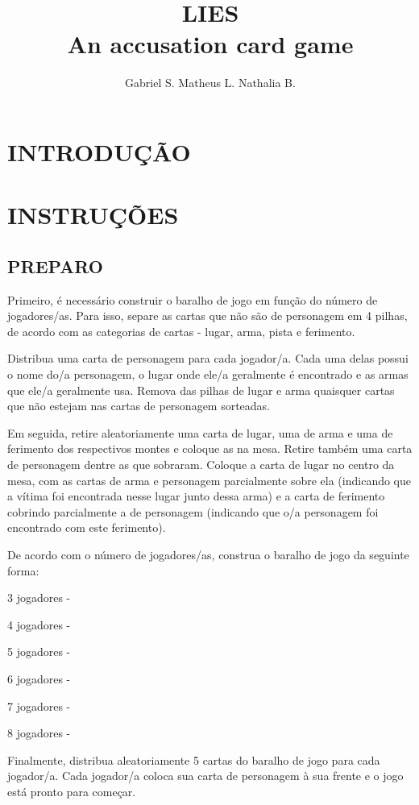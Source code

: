 \documentclass[a4paper, 11pt]{article}
\title{\textbf{LIES} \\ \small{An accusation card game}}
\author{Gabriel S. Matheus L. Nathalia B.}
\begin{document}
\maketitle

\newpage

\newpage

\section*{INTRODUÇÃO}


\section*{INSTRUÇÕES}

\vspace{5mm}


\subsection*{PREPARO}

Primeiro, é necessário construir o baralho de jogo em função do número de jogadores/as. Para isso, separe as cartas que não são de personagem em 4 pilhas, de acordo com as categorias de cartas - lugar, arma, pista e ferimento. 

Distribua uma carta de personagem para cada jogador/a. Cada uma delas possui o nome do/a personagem, o lugar onde ele/a geralmente é encontrado e as armas que ele/a geralmente usa. Remova das pilhas de lugar e arma quaisquer cartas que não estejam nas cartas de personagem sorteadas.


Em seguida, retire aleatoriamente uma carta de lugar, uma de arma e uma de ferimento dos respectivos montes e coloque as na mesa. Retire também uma carta de personagem dentre as que sobraram. Coloque a carta de lugar no centro da mesa, com as cartas de arma e personagem parcialmente sobre ela (indicando que a vítima foi encontrada nesse lugar junto dessa arma) e a carta de ferimento cobrindo parcialmente a de personagem (indicando que o/a personagem foi encontrado com este ferimento).

De acordo com o número de jogadores/as, construa o baralho de jogo da seguinte forma:


3 jogadores - 

4 jogadores - 

5 jogadores - 

6 jogadores - 

7 jogadores  - 

8 jogadores - 

Finalmente, distribua aleatoriamente 5 cartas do baralho de jogo para cada jogador/a. Cada jogador/a coloca sua carta de personagem à sua frente e o jogo está pronto para começar.
\end{document}

